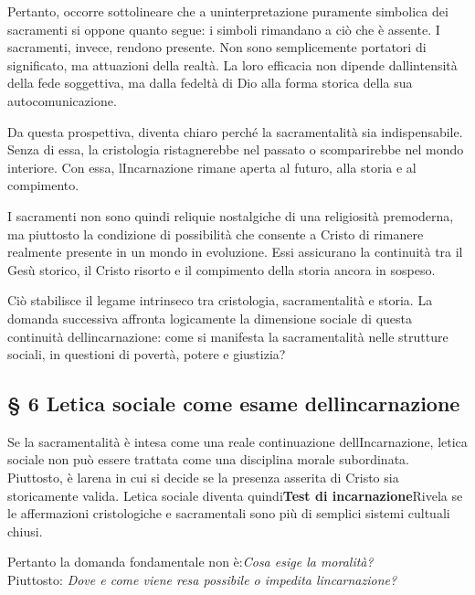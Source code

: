 \documentclass[
]{article}
\begin{document}
Pertanto, occorre sottolineare che a un\textquotesingle interpretazione puramente simbolica dei sacramenti si oppone quanto segue: i simboli rimandano a ciò che è assente. I sacramenti, invece, rendono presente. Non sono semplicemente portatori di significato, ma attuazioni della realtà. La loro efficacia non dipende dall\textquotesingle intensità della fede soggettiva, ma dalla fedeltà di Dio alla forma storica della sua autocomunicazione.

Da questa prospettiva, diventa chiaro perché la sacramentalità sia indispensabile. Senza di essa, la cristologia ristagnerebbe nel passato o scomparirebbe nel mondo interiore. Con essa, l\textquotesingle Incarnazione rimane aperta al futuro, alla storia e al compimento.

I sacramenti non sono quindi reliquie nostalgiche di una religiosità premoderna, ma piuttosto la condizione di possibilità che consente a Cristo di rimanere realmente presente in un mondo in evoluzione. Essi assicurano la continuità tra il Gesù storico, il Cristo risorto e il compimento della storia ancora in sospeso.

Ciò stabilisce il legame intrinseco tra cristologia, sacramentalità e storia. La domanda successiva affronta logicamente la dimensione sociale di questa continuità dell\textquotesingle incarnazione: come si manifesta la sacramentalità nelle strutture sociali, in questioni di povertà, potere e giustizia?

\subsection{\texorpdfstring{\textbf{§ 6 L\textquotesingle etica sociale come esame dell\textquotesingle incarnazione}}{§ 6 L\textquotesingle etica sociale come esame dell\textquotesingle incarnazione}}\label{letica-sociale-come-esame-dellincarnazione}

Se la sacramentalità è intesa come una reale continuazione dell\textquotesingle Incarnazione, l\textquotesingle etica sociale non può essere trattata come una disciplina morale subordinata. Piuttosto, è l\textquotesingle arena in cui si decide se la presenza asserita di Cristo sia storicamente valida. L\textquotesingle etica sociale diventa quindi\textbf{Test di incarnazione}Rivela se le affermazioni cristologiche e sacramentali sono più di semplici sistemi cultuali chiusi.

Pertanto la domanda fondamentale non è:\emph{Cosa esige la moralità?\\
}Piuttosto: \emph{Dove e come viene resa possibile o impedita l\textquotesingle incarnazione?}
\end{document}
